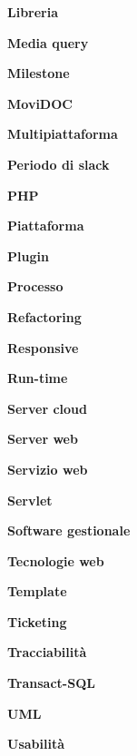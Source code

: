 \textbf{Libreria}

\textbf{Media query}

\textbf{Milestone}

\textbf{MoviDOC}

\textbf{Multipiattaforma}

\textbf{Periodo di slack}

\textbf{PHP}

\textbf{Piattaforma}

\textbf{Plugin}

\textbf{Processo}

\textbf{Refactoring}

\textbf{Responsive}

\textbf{Run-time}

\textbf{Server cloud}

\textbf{Server web}

\textbf{Servizio web}

\textbf{Servlet}

\textbf{Software gestionale}

\textbf{Tecnologie web}

\textbf{Template}

\textbf{Ticketing}

\textbf{Tracciabilità}

\textbf{Transact-SQL}

\textbf{UML}

\textbf{Usabilità}